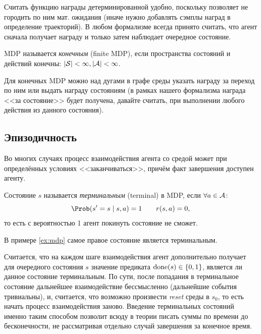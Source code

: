 Считать функцию награды детерминированной удобно, поскольку позволяет не городить по ним мат. ожидания (иначе нужно добавлять сэмплы наград в определение траекторий). В любом формализме всегда принято считать, что агент сначала получает награду и только затем наблюдает очередное состояние. 

\begin{definition}
MDP называется \emph{конечным} (finite MDP), если пространства состояний и действий конечны: $|\mathcal{S}| < \infty, |\mathcal{A}| < \infty$.
\end{definition}

\begin{exampleBox}[label=ex:mdp]{}
Для конечных MDP можно над дугами в графе среды указать награду за переход по ним или выдать награду состояниям (в рамках нашего формализма награда <<за состояние>> будет получена, давайте считать, при выполнении любого действия из данного состояния).
\begin{center}
\end{center}
\end{exampleBox}

\subsection{Эпизодичность}

Во многих случаях процесс взаимодействия агента со средой может при определённых условиях <<заканчиваться>>, причём факт завершения доступен агенту.

\begin{definition}
Состояние $s$ называется \emph{терминальным} (terminal) в MDP, если $\forall a \in \mathcal{A} \colon$
$$\Prob (s' = s \mid s, a) = 1 \qquad r(s, a) = 0,$$
то есть с вероятностью 1 агент покинуть состояние не сможет.
\end{definition}

\begin{example}
В примере \ref{ex:mdp} самое правое состояние является терминальным.
\end{example}

Считается, что на каждом шаге взаимодействия агент дополнительно получает для очередного состояния $s$ значение предиката $\done(s) \HM\in \{0, 1\}$, является ли данное состояние терминальным. По сути, после попадания в терминальное состояние дальнейшее взаимодействие бессмысленно (дальнейшие события тривиальны), и, считается, что возможно произвести \emph{reset} среды в $s_0$, то есть начать процесс взаимодействия заново. Введение терминальных состояний именно таким способом позволит всюду в теории писать суммы по времени до бесконечности, не рассматривая отдельно случай завершения за конечное время.

